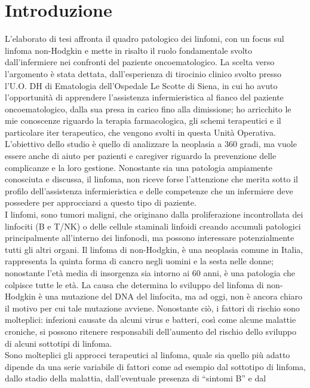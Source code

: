 \section*{Introduzione}
   
L’elaborato di tesi affronta il quadro patologico dei linfomi, con un focus sul linfoma non-Hodgkin e mette in risalto 
il ruolo fondamentale svolto dall’infermiere nei confronti del paziente oncoematologico.
La scelta verso l’argomento è stata dettata, dall’esperienza di tirocinio clinico svolto presso l’U.O. DH di Ematologia 
dell’Ospedale Le Scotte di Siena, in cui ho avuto l’opportunità di apprendere l’assistenza infermieristica al fianco del 
paziente oncoematologico, dalla sua presa in carico fino alla dimissione; ho arricchito le mie conoscenze riguardo la 
terapia farmacologica, gli schemi terapeutici e il particolare iter  terapeutico, che vengono svolti in questa Unità Operativa.\\
L’obiettivo dello studio è quello di analizzare la neoplasia a 360 gradi, ma vuole essere anche di aiuto per pazienti e 
caregiver riguardo la prevenzione delle complicanze e la loro gestione. Nonostante sia una patologia ampiamente conosciuta e 
discussa, il linfoma, non riceve forse l’attenzione che merita sotto il profilo dell’assistenza infermieristica e delle 
competenze che un infermiere deve possedere per approcciarsi a questo tipo di paziente.\\
I linfomi, sono tumori maligni, che originano dalla proliferazione incontrollata dei linfociti (B e T/NK) o delle cellule 
staminali linfoidi creando accumuli patologici principalmente all’interno dei linfonodi, ma possono interessare 
potenzialmente tutti gli altri organi. Il linfoma di non-Hodgkin, è una neoplasia comune in Italia, rappresenta la quinta 
forma di cancro negli uomini e la sesta nelle donne; nonostante l’età media di insorgenza sia intorno ai 60 anni, è una 
patologia che colpisce tutte le età. La causa che determina lo sviluppo del linfoma di non-Hodgkin è una mutazione del DNA del 
linfocita, ma ad oggi, non è ancora chiaro il motivo per cui tale mutazione avviene. Nonostante  ciò, i fattori di rischio 
sono molteplici: infezioni causate da alcuni virus e batteri, così come alcune malattie croniche, si possono ritenere 
responsabili dell’aumento del rischio dello sviluppo di alcuni sottotipi di linfoma.\\
Sono molteplici gli approcci terapeutici al linfoma, quale sia quello più adatto dipende da una serie variabile di fattori 
come ad esempio dal sottotipo di linfoma, dallo stadio della malattia, dall’eventuale presenza di “sintomi B” e dal 
